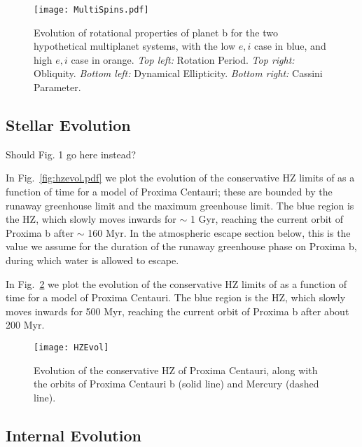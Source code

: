 \documentclass[preprint,12pt]{aastex}
\newcommand{\xxx}[1]{{\color{red} #1}} %
\begin{document}
\begin{figure} 
\begin{center}
\texttt{[image: MultiSpins.pdf]}
\end{center}
\caption{Evolution of rotational properties of planet b for the
 two hypothetical multiplanet systems, with the low $e,i$ case 
 in blue, and high $e,i$ case in orange. {\it Top left:} Rotation
 Period. {\it Top right:} Obliquity. {\it Bottom left:} Dynamical
 Ellipticity. {\it Bottom right:} Cassini Parameter.}
\label{fig:MultiSpins}
\end{figure}




\subsection{Stellar Evolution}
\label{sec:results:stellar}

\xxx{Should Fig. 1 go here instead?}

In Fig.~\ref{fig:hzevol.pdf} we plot the evolution of the conservative HZ
limits of \cite{Kopparapu13} as a function of time for a model of
Proxima Centauri; these are bounded by the runaway greenhouse limit
and the maximum greenhouse limit. The blue region is the HZ, which
slowly moves inwards for $\sim$ 1 Gyr, reaching the current orbit of
Proxima b after $\sim$ 160 Myr. In the atmospheric escape section
below, this is the value we assume for the duration of the runaway
greenhouse phase on Proxima b, during which water is allowed to
escape.

In Fig.~\ref{fig:HZEvol} we plot the evolution of the conservative HZ limits of \cite{Kopparapu13} as a function of time for a model of Proxima Centauri. The blue region is the HZ, which slowly moves inwards for 500 Myr, reaching the current orbit of Proxima b after about 200 Myr.

\begin{figure}[ht]
\centering
\texttt{[image: HZEvol]}
\caption{Evolution of the conservative HZ of Proxima Centauri, along with the orbits of Proxima Centauri b (solid line) and Mercury (dashed line).}
\label{fig:HZEvol}
\end{figure}

\subsection{Internal Evolution}
\label{sec:results:internal}
\end{document}
